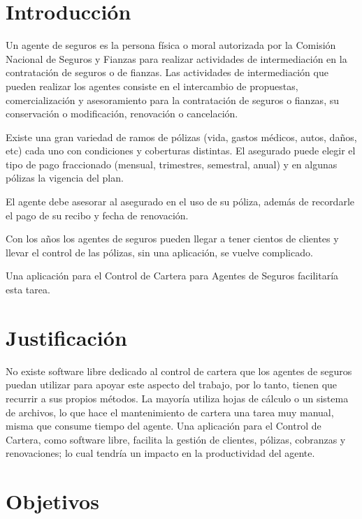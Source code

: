 \setcounter{page}{1}
\tableofcontents

\section{Introducción}%
Un agente de seguros es la persona física o moral autorizada por la Comisión Nacional de Seguros y Fianzas para realizar actividades de intermediación en la contratación de seguros o de fianzas. Las actividades de intermediación que pueden realizar los agentes consiste en el intercambio de propuestas, comercialización y asesoramiento para la contratación de seguros o fianzas, su conservación o modificación, renovación o cancelación. \cite{www:reg-agentes}

Existe una gran variedad de ramos de pólizas (vida, gastos médicos, autos, daños, etc) cada uno con condiciones y coberturas distintas. El asegurado puede elegir el tipo de pago fraccionado (mensual, trimestres, semestral, anual) y en algunas pólizas la vigencia del plan.

El agente debe asesorar al asegurado en el uso de su póliza, además de recordarle el pago de su recibo y fecha de renovación.

Con los años los agentes de seguros pueden llegar a tener cientos de clientes y llevar el control de las pólizas, sin una aplicación, se vuelve complicado.

Una aplicación para el Control de Cartera para Agentes de Seguros facilitaría esta tarea.

\section{Justificación}

No existe software libre dedicado al control de cartera que los agentes de seguros puedan utilizar para apoyar este aspecto del trabajo, por lo tanto, tienen que recurrir a sus propios métodos. La mayoría utiliza hojas de cálculo o un sistema de archivos, lo que hace el mantenimiento de cartera una tarea muy manual, misma que consume tiempo del agente.
Una aplicación para el Control de Cartera, como software libre, facilita la gestión de clientes, pólizas, cobranzas y renovaciones; lo cual tendría un impacto en la productividad del agente.

\section{Objetivos}
